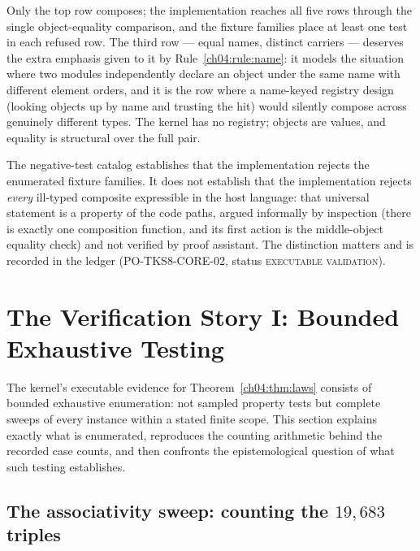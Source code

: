 Only the top row composes; the implementation reaches all five rows
through the single object-equality comparison, and the fixture families
place at least one test in each refused row. The third row --- equal
names, distinct carriers --- deserves the extra emphasis given to it by
Rule~\ref{ch04:rule:name}: it models the situation where two modules
independently declare an object under the same name with different element
orders, and it is the row where a name-keyed registry design (looking
objects up by name and trusting the hit) would silently compose across
genuinely different types. The kernel has no registry; objects are values,
and equality is structural over the full pair.

\begin{boundary}
\label{ch04:bound:negative}
The negative-test catalog establishes that the implementation rejects the
enumerated fixture families. It does not establish that the implementation
rejects \emph{every} ill-typed composite expressible in the host language:
that universal statement is a property of the code paths, argued informally
by inspection (there is exactly one composition function, and its first
action is the middle-object equality check) and not verified by proof
assistant. The distinction matters and is recorded in the ledger
(PO-TKS8-CORE-02, status \textsc{executable validation}).
\end{boundary}

\section{The Verification Story I: Bounded Exhaustive Testing}
\label{ch04:sec:evidence}

The kernel's executable evidence for Theorem~\ref{ch04:thm:laws} consists of
bounded exhaustive enumeration: not sampled property tests but complete
sweeps of every instance within a stated finite scope. This section explains
exactly what is enumerated, reproduces the counting arithmetic behind the
recorded case counts, and then confronts the epistemological question of
what such testing establishes.

\subsection{The associativity sweep: counting the $19{,}683$ triples}
\label{ch04:sec:assoc-count}

